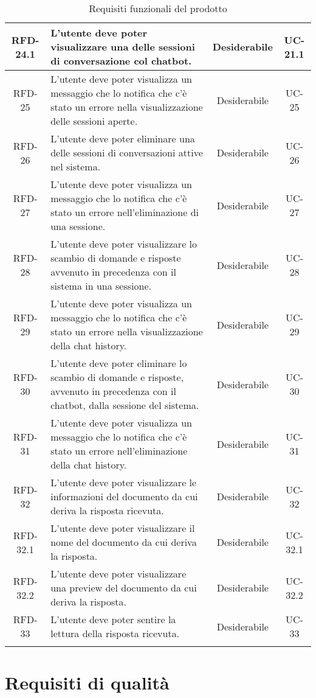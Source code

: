 \begin{xltabular}{\textwidth}{| c | X | c | c |}
    \hline
    RFD-24.1 & L’utente deve poter visualizzare una delle sessioni di conversazione col chatbot. & Desiderabile & UC-21.1 \\
    \hline
    RFD-25 & L'utente deve poter visualizza un messaggio che lo notifica che c'è stato un errore nella visualizzazione delle sessioni aperte. & Desiderabile & UC-25 \\
    \hline
    RFD-26 & L’utente deve poter eliminare una delle sessioni di conversazioni attive nel sistema. & Desiderabile & UC-26 \\
    \hline
    RFD-27 & L'utente deve poter visualizza un messaggio che lo notifica che c'è stato un errore nell'eliminazione di una sessione. & Desiderabile & UC-27 \\
    \hline
    RFD-28 & L’utente deve poter visualizzare lo scambio di domande e risposte avvenuto in precedenza con il sistema in una sessione. & Desiderabile & UC-28 \\
    \hline
    RFD-29 & L'utente deve poter visualizza un messaggio che lo notifica che c'è stato un errore nella visualizzazione della chat history. & Desiderabile & UC-29 \\
    \hline
    RFD-30 & L’utente deve poter eliminare lo scambio di domande e risposte, avvenuto in precedenza con il chatbot, dalla sessione del sistema. & Desiderabile & UC-30 \\
    \hline
    RFD-31 & L'utente deve poter visualizza un messaggio che lo notifica che c'è stato un errore nell'eliminazione della chat history. & Desiderabile & UC-31 \\
    \hline
    RFD-32 & L’utente deve poter visualizzare le informazioni del documento da cui deriva la risposta ricevuta. & Desiderabile & UC-32 \\
    \hline
    RFD-32.1 & L’utente deve poter visualizzare il nome del documento da cui deriva la risposta. & Desiderabile & UC-32.1 \\
    \hline
    RFD-32.2 & L’utente deve poter visualizzare una preview del documento da cui deriva la risposta. & Desiderabile & UC-32.2 \\
    \hline
    RFD-33 & L’utente deve poter sentire la lettura della risposta ricevuta. & Desiderabile & UC-33 \\
    \hline
     \caption{Requisiti funzionali del prodotto}
    \label{tab:reqfun}
\end{xltabular}
\endgroup

\section{Requisiti di qualità}

